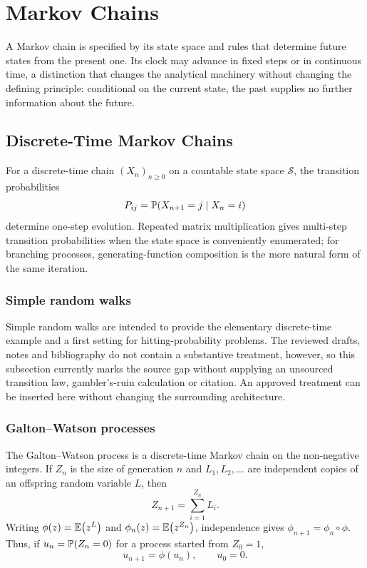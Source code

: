 \section{Markov Chains}\label{m:sec:markov-chains}

A Markov chain is specified by its state space and rules that determine future
states from the present one.  Its clock may advance in fixed steps or in continuous
time, a distinction that changes the analytical machinery without changing the
defining principle: conditional on the current state, the past supplies no further
information about the future.

\subsection{Discrete-Time Markov Chains}\label{m:sec:dtmc}

For a discrete-time chain $(X_n)_{n\geq0}$ on a countable state space
$\mathcal S$, the transition probabilities
\[
  P_{ij}=\mathbb{P}\!\left(X_{n+1}=j\mid X_n=i\right)
\]
determine one-step evolution.  Repeated matrix multiplication gives multi-step
transition probabilities when the state space is conveniently enumerated; for
branching processes, generating-function composition is the more natural form of
the same iteration.

\subsubsection{Simple random walks}\label{m:sec:random-walks}

Simple random walks are intended to provide the elementary discrete-time example
and a first setting for hitting-probability problems.  The reviewed drafts, notes
and bibliography do not contain a substantive treatment, however, so this
subsection currently marks the source gap without supplying an unsourced transition
law, gambler's-ruin calculation or citation.  An approved treatment can be inserted
here without changing the surrounding architecture.

\subsubsection{Galton--Watson processes}\label{m:sec:gw}

The Galton--Watson process is a discrete-time Markov chain on the non-negative
integers.  If $Z_n$ is the size of generation $n$ and $L_1,L_2,\ldots$ are
independent copies of an offspring random variable $L$, then
\begin{equation}
  Z_{n+1}=\sum_{i=1}^{Z_n}L_i .
  \label{m:eq:gwrecursion}
\end{equation}
Writing $\phi(z)=\mathbb{E}\!\left(z^L\right)$ and $\phi_n(z)=\mathbb{E}\!\left(z^{Z_n}\right)$, independence gives
$\phi_{n+1}=\phi_n\circ\phi$.  Thus, if
$u_n=\mathbb{P}\!\left(Z_n=0\right)$ for a process started from $Z_0=1$,
\begin{equation}
  u_{n+1}=\phi(u_n),\qquad u_0=0.
  \label{m:eq:gw-pgf-iteration}
\end{equation}

